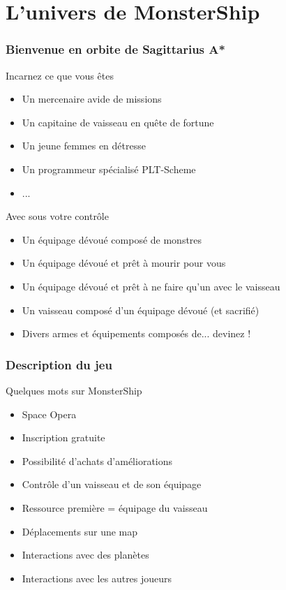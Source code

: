 \documentclass{beamer}
\begin{document}
	\section{L'univers de MonsterShip}
		\begin{frame}
			\frametitle{Bienvenue en orbite de Sagittarius A*}
			\begin{block}{Incarnez ce que vous êtes}
				\begin{itemize}
					\item Un mercenaire avide de missions
					\item Un capitaine de vaisseau en quête de fortune
					\item Un jeune femmes en détresse
					\item Un programmeur spécialisé PLT-Scheme
					\item ...
				\end{itemize}
			\end{block}
			
			\begin{block}{Avec sous votre contrôle}
				\begin{itemize}
					\item Un équipage dévoué composé de monstres
					\item Un équipage dévoué et prêt à mourir pour vous
					\item Un équipage dévoué et prêt à ne faire qu'un avec le vaisseau
					\item Un vaisseau composé d'un équipage dévoué (et sacrifié)
					\item Divers armes et équipements composés de... devinez !
				\end{itemize}
			\end{block}
		\end{frame}
		
		\begin{frame}
			\frametitle{Description du jeu}
			\begin{block}{Quelques mots sur MonsterShip}
				\begin{itemize}
					\item Space Opera
					\item Inscription gratuite
					\item Possibilité d'achats d'améliorations
					\item Contrôle d'un vaisseau et de son équipage
					\item Ressource première = équipage du vaisseau
					\item Déplacements sur une map
					\item Interactions avec des planètes
					\item Interactions avec les autres joueurs
				\end{itemize}
			\end{block}
		\end{frame}
		
\end{document}
